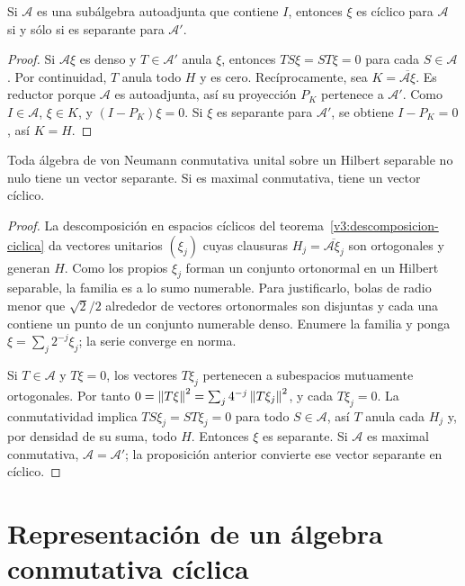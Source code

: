\begin{proposicion}\label{v3:ciclico-separante}
Si $\mathcal A$ es una subálgebra autoadjunta que contiene $I$, entonces $\xi$ es cíclico para $\mathcal A$ si y sólo si es separante para $\mathcal A'$.
\end{proposicion}
\begin{proof}
Si $\mathcal A\xi$ es denso y $T\in\mathcal A'$ anula $\xi$, entonces $TS\xi=ST\xi=0$ para cada $S\in\mathcal A$. Por continuidad, $T$ anula todo $H$ y es cero. Recíprocamente, sea $K=\overline{\mathcal A\xi}$. Es reductor porque $\mathcal A$ es autoadjunta, así su proyección $P_K$ pertenece a $\mathcal A'$. Como $I\in\mathcal A$, $\xi\in K$, y $(I-P_K)\xi=0$. Si $\xi$ es separante para $\mathcal A'$, se obtiene $I-P_K=0$, así $K=H$.
\end{proof}

\begin{teorema}\label{v3:separante-abeliana}
Toda álgebra de von Neumann conmutativa unital sobre un Hilbert separable no nulo tiene un vector separante. Si es maximal conmutativa, tiene un vector cíclico.
\end{teorema}
\begin{proof}
La descomposición en espacios cíclicos del teorema~\ref{v3:descomposicion-ciclica} da vectores unitarios $(\xi_j)$ cuyas clausuras $H_j=\overline{\mathcal A\xi_j}$ son ortogonales y generan $H$. Como los propios $\xi_j$ forman un conjunto ortonormal en un Hilbert separable, la familia es a lo sumo numerable. Para justificarlo, bolas de radio menor que $\sqrt2/2$ alrededor de vectores ortonormales son disjuntas y cada una contiene un punto de un conjunto numerable denso. Enumere la familia y ponga $\xi=\sum_j2^{-j}\xi_j$; la serie converge en norma.

Si $T\in\mathcal A$ y $T\xi=0$, los vectores $T\xi_j$ pertenecen a subespacios mutuamente ortogonales. Por tanto
$0=\left\lVert T\xi\right\rVert^2=\sum_j4^{-j}\left\lVert T\xi_j\right\rVert^2$, y cada $T\xi_j=0$. La conmutatividad implica $TS\xi_j=ST\xi_j=0$ para todo $S\in\mathcal A$, así $T$ anula cada $H_j$ y, por densidad de su suma, todo $H$. Entonces $\xi$ es separante. Si $\mathcal A$ es maximal conmutativa, $\mathcal A=\mathcal A'$; la proposición anterior convierte ese vector separante en cíclico.
\end{proof}

\section{Representación de un álgebra conmutativa cíclica}

